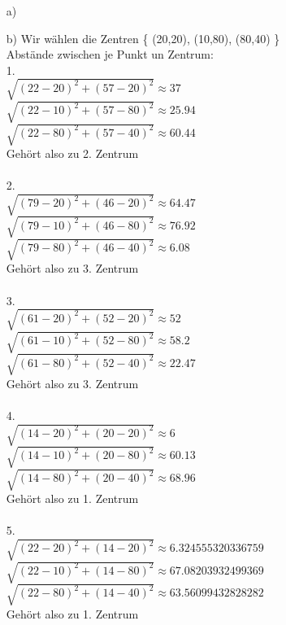\begin{enumerate}

\item[a)]

\item[b)]
Wir wählen die Zentren \{ (20,20), (10,80), (80,40) \} \\

Abstände zwischen je Punkt un Zentrum: \\

1. \\ 
$\sqrt{(22-20)^2 + (57-20)^2} \approx 37$ \\
$\sqrt{(22-10)^2 + (57-80)^2} \approx 25.94$ \\
$\sqrt{(22-80)^2 + (57-40)^2} \approx 60.44$ \\
Gehört also zu 2. Zentrum \\ \\

2. \\
$\sqrt{(79-20)^2 + (46-20)^2} \approx 64.47$ \\
$\sqrt{(79-10)^2 + (46-80)^2} \approx 76.92$ \\
$\sqrt{(79-80)^2 + (46-40)^2} \approx 6.08$ \\
Gehört also zu 3. Zentrum \\ \\

3. \\
$\sqrt{(61-20)^2 + (52-20)^2} \approx 52$ \\
$\sqrt{(61-10)^2 + (52-80)^2} \approx 58.2$ \\
$\sqrt{(61-80)^2 + (52-40)^2} \approx 22.47$ \\ 
Gehört also zu 3. Zentrum \\ \\

4. \\
$\sqrt{(14-20)^2 + (20-20)^2} \approx 6$ \\
$\sqrt{(14-10)^2 + (20-80)^2} \approx 60.13$ \\
$\sqrt{(14-80)^2 + (20-40)^2} \approx 68.96$ \\
Gehört also zu 1. Zentrum \\ \\

5. \\ 
$\sqrt{(22-20)^2 + (14-20)^2} \approx 6.324555320336759$ \\ 
$\sqrt{(22-10)^2 + (14-80)^2} \approx 67.08203932499369$ \\ 
$\sqrt{(22-80)^2 + (14-40)^2} \approx 63.56099432828282$ \\
Gehört also zu 1. Zentrum \\ \\


\end{enumerate}

